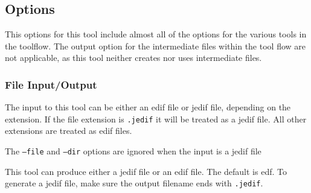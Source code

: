 \subsection{Options}

This options for this tool include almost all of the options for the
various tools in the toolflow. The output option for the intermediate
files within the tool flow are not applicable, as this tool neither
creates nor uses intermediate files.

\subsubsection{File Input/Output}

The input to this tool can be either an edif file or jedif file,
depending on the extension. If the file extension is \texttt{.jedif}
it will be treated as a jedif file. All other extensions are treated
as edif files.

The \texttt{--file} and \texttt{--dir} options are ignored when the
input is a jedif file

This tool can produce either a jedif file or an edif file. The default
is edf. To generate a jedif file, make sure the output filename ends
with \texttt{.jedif}.
